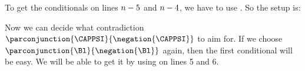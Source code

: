 To get the conditionals on lines $n-5$ and $n-4$, we have to use . So the setup is:
\begin{gproof}
\end{gproof}
Now we can decide what contradiction $\parconjunction{\CAPPSI}{\negation{\CAPPSI}}$ to aim for. If we choose $\parconjunction{\Bl}{\negation{\Bl}}$ again, then the first conditional will be easy. We will be able to get it by using  on lines 5 and 6.

